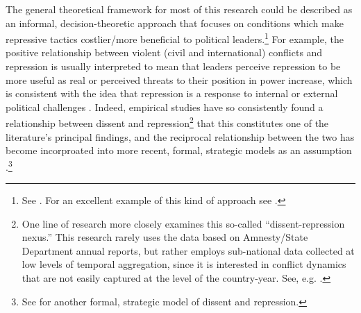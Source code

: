 \documentclass[11pt]{article}
\begin{document}
The general theoretical framework for most of this research could be described as an informal, decision-theoretic approach that focuses on conditions which make repressive tactics costlier/more beneficial to political leaders.\footnote{See \citet{Davenport2007AR}. For an excellent example of this kind of approach see \citet{Poe2004}.} For example, the positive relationship between violent (civil and international) conflicts and repression is usually interpreted to mean that leaders perceive repression to be more useful as real or perceived threats to their position in power increase, which is consistent with the idea that repression is a response to internal or external political challenges \citep[See, e.g.][]{Tilly1978,Tilly1985,Gurr1986,Gurr1988,Davenport1995}. Indeed, empirical studies have so consistently found a relationship between dissent and repression\footnote{One line of research more closely examines this so-called ``dissent-repression nexus.'' This research rarely uses the data based on Amnesty/State Department annual reports, but rather employs sub-national data collected at low levels of temporal aggregation, since it is interested in conflict dynamics that are not easily captured at the level of the country-year. See, e.g. \citet{Francisco1995,Moore1995jcr,Francisco1996,Rasler1996,Moore1998,Davenport2005,Shellman2006,
FieldingShortland2010}.} that this constitutes one of the literature's principal findings, and the reciprocal relationship between the two has become incorproated into more recent, formal, strategic models as an assumption \citep{RitterJCR}.\footnote{See \citet{Pierskalla2010} for another formal, strategic model of dissent and repression.} 
\end{document}

